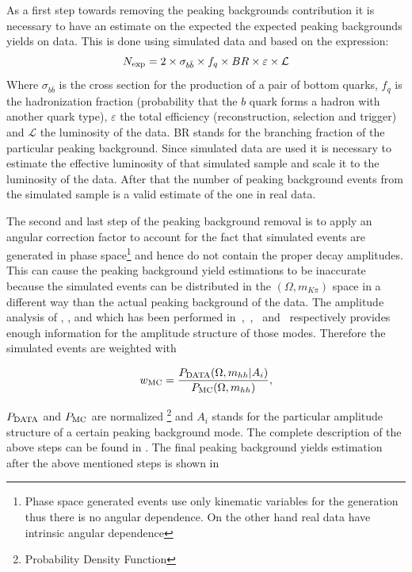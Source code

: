 As a first step towards removing the peaking backgrounds contribution it is necessary to have an estimate on the expected 
the expected peaking backgrounds yields on data. This is done using simulated data and based on the expression:
\begin{equation}
N_{\rm exp} = 2 \times \sigma_{b\bar{b}}\times f_q \times BR \times \varepsilon \times {\mathcal{L}}
\end{equation}
\noindent Where $\sigma_{b\bar{b}}$ is the cross section for the production of a pair of bottom quarks, $f_q$ is the hadronization fraction
(probability that the $b$ quark forms a hadron with another quark type), $\varepsilon$ the total efficiency (reconstruction, selection and trigger)
and ${\mathcal{L}}$ the luminosity of the data. BR stands for the branching fraction of the particular peaking background. Since simulated data are used
it is necessary to estimate the effective luminosity of that simulated sample and scale it to the luminosity of the data. After that the number of
peaking background events from the simulated sample is a valid estimate of the one in real data.

The second and last step of the peaking background removal is to apply an angular correction factor to account for the fact that 
simulated events are generated in phase space\footnote{Phase space generated events use only kinematic variables for the generation
thus there is no angular dependence. On the other hand real data have intrinsic angular dependence} and hence do not contain the proper decay amplitudes.
This can cause the peaking background yield estimations to be inaccurate because the simulated events can be distributed in the $(\Omega, m_{K\pi})$ space
in a different way than the actual peaking background of the data. The amplitude analysis of \BdJpsipipi, \BsJpsipipi, \BsJpsiKK and \LbJpsipK 
which has been performed in~\cite{SheldonBdpipi},~\cite{SheldonBspipi},~\cite{SheldonKK} and~\cite{Gao:1701984} respectively provides enough information
for the amplitude structure of those modes. Therefore the simulated events are weighted with

\begin{equation}
w_{\rm MC} = \frac{P_{\rm DATA} (\Omega, m_{hh}  | {A_i})}{P_{\rm MC}(\Omega, m_{hh})},
\end{equation}

\noindent $P_{\rm DATA}$ and $P_{\rm MC}$ are normalized \pdfs\footnote{Probability Density Function} and $A_i$ stands for
the particular amplitude structure of a certain peaking background mode. The complete description of the above steps can be found in \cite{BsJpsiKst_ANA}.
The final peaking background yields estimation after the above mentioned steps is shown in 

